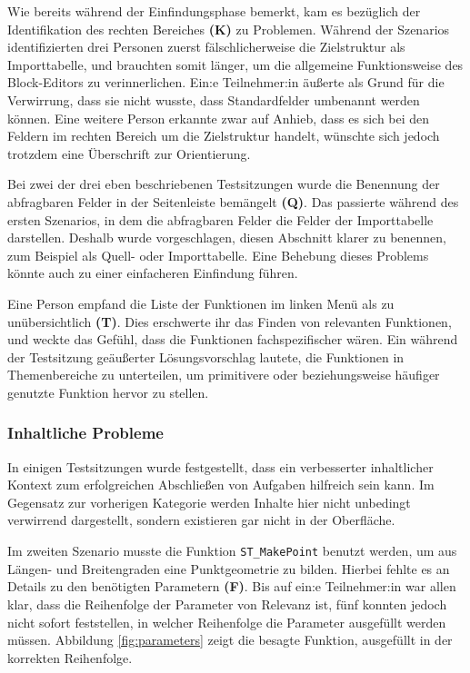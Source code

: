 \pskip
Wie bereits während der Einfindungsphase bemerkt, kam es bezüglich der Identifikation des rechten Bereiches \textbf{(K)} zu Problemen. Während der Szenarios identifizierten drei Personen zuerst fälschlicherweise die Zielstruktur als Importtabelle, und brauchten somit länger, um die allgemeine Funktionsweise des Block-Editors zu verinnerlichen. Ein:e Teilnehmer:in äußerte als Grund für die Verwirrung, dass sie nicht wusste, dass Standardfelder umbenannt werden können. Eine weitere Person erkannte zwar auf Anhieb, dass es sich bei den Feldern im rechten Bereich um die Zielstruktur handelt, wünschte sich jedoch trotzdem eine Überschrift zur Orientierung.

\pskip
Bei zwei der drei eben beschriebenen Testsitzungen wurde die Benennung der abfragbaren Felder in der Seitenleiste bemängelt \textbf{(Q)}. Das passierte während des ersten Szenarios, in dem die abfragbaren Felder die Felder der Importtabelle darstellen. Deshalb wurde vorgeschlagen, diesen Abschnitt klarer zu benennen, zum Beispiel als Quell- oder Importtabelle. Eine Behebung dieses Problems könnte auch zu einer einfacheren Einfindung führen.

\pskip
Eine Person empfand die Liste der Funktionen im linken Menü als zu unübersichtlich \textbf{(T)}. Dies erschwerte ihr das Finden von relevanten Funktionen, und weckte das Gefühl, dass die Funktionen fachspezifischer wären. Ein während der Testsitzung geäußerter Lösungsvorschlag lautete, die Funktionen in Themenbereiche zu unterteilen, um primitivere oder beziehungsweise häufiger genutzte Funktion hervor zu stellen.

\subsubsection{Inhaltliche Probleme}
In einigen Testsitzungen wurde festgestellt, dass ein verbesserter inhaltlicher Kontext zum erfolgreichen Abschließen von Aufgaben hilfreich sein kann. Im Gegensatz zur vorherigen Kategorie werden Inhalte hier nicht unbedingt verwirrend dargestellt, sondern existieren gar nicht in der Oberfläche.

\pskip
Im zweiten Szenario musste die Funktion \texttt{ST\_MakePoint} benutzt werden, um aus Längen- und Breitengraden eine Punktgeometrie zu bilden. Hierbei fehlte es an Details zu den benötigten Parametern \textbf{(F)}. Bis auf ein:e Teilnehmer:in war allen klar, dass die Reihenfolge der Parameter von Relevanz ist, fünf konnten jedoch nicht sofort feststellen, in welcher Reihenfolge die Parameter ausgefüllt werden müssen. Abbildung \ref{fig:parameters} zeigt die besagte Funktion, ausgefüllt in der korrekten Reihenfolge.

